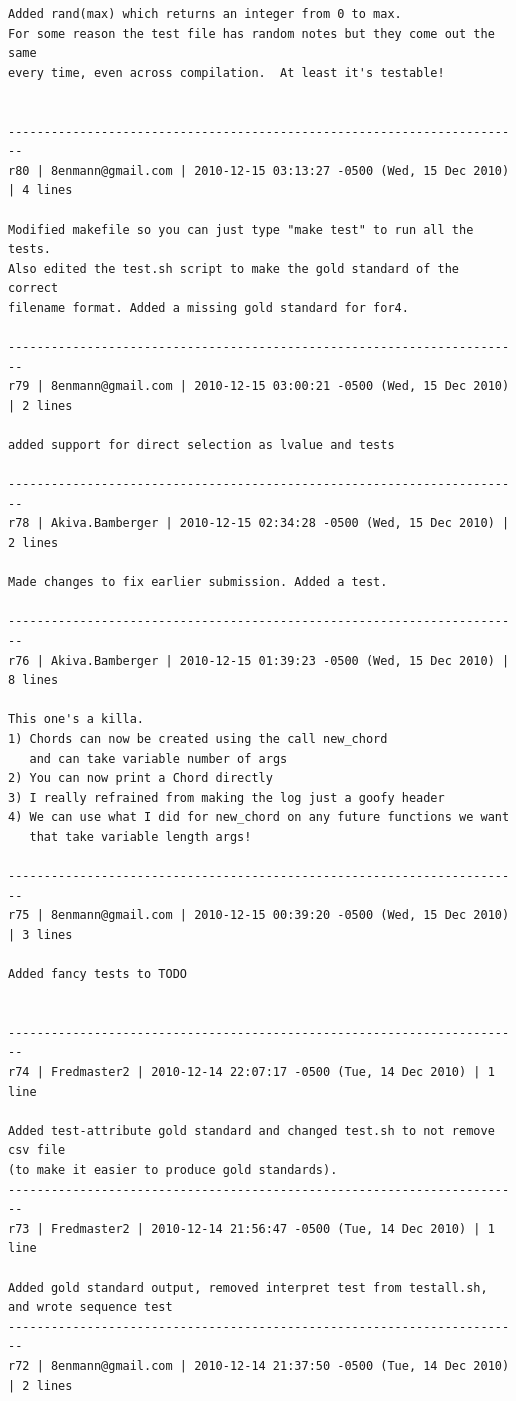 \documentclass[12pt,A4]{book}
\begin{document}
\begin{verbatim}
Added rand(max) which returns an integer from 0 to max.
For some reason the test file has random notes but they come out the same
every time, even across compilation.  At least it's testable!


------------------------------------------------------------------------
r80 | 8enmann@gmail.com | 2010-12-15 03:13:27 -0500 (Wed, 15 Dec 2010) | 4 lines

Modified makefile so you can just type "make test" to run all the tests.
Also edited the test.sh script to make the gold standard of the correct 
filename format. Added a missing gold standard for for4.

------------------------------------------------------------------------
r79 | 8enmann@gmail.com | 2010-12-15 03:00:21 -0500 (Wed, 15 Dec 2010) | 2 lines

added support for direct selection as lvalue and tests

------------------------------------------------------------------------
r78 | Akiva.Bamberger | 2010-12-15 02:34:28 -0500 (Wed, 15 Dec 2010) | 2 lines

Made changes to fix earlier submission. Added a test.

------------------------------------------------------------------------
r76 | Akiva.Bamberger | 2010-12-15 01:39:23 -0500 (Wed, 15 Dec 2010) | 8 lines

This one's a killa.
1) Chords can now be created using the call new_chord 
   and can take variable number of args
2) You can now print a Chord directly
3) I really refrained from making the log just a goofy header
4) We can use what I did for new_chord on any future functions we want
   that take variable length args!

------------------------------------------------------------------------
r75 | 8enmann@gmail.com | 2010-12-15 00:39:20 -0500 (Wed, 15 Dec 2010) | 3 lines

Added fancy tests to TODO


------------------------------------------------------------------------
r74 | Fredmaster2 | 2010-12-14 22:07:17 -0500 (Tue, 14 Dec 2010) | 1 line

Added test-attribute gold standard and changed test.sh to not remove csv file
(to make it easier to produce gold standards).
------------------------------------------------------------------------
r73 | Fredmaster2 | 2010-12-14 21:56:47 -0500 (Tue, 14 Dec 2010) | 1 line

Added gold standard output, removed interpret test from testall.sh, and wrote sequence test
------------------------------------------------------------------------
r72 | 8enmann@gmail.com | 2010-12-14 21:37:50 -0500 (Tue, 14 Dec 2010) | 2 lines


\end{verbatim}
\end{document}
